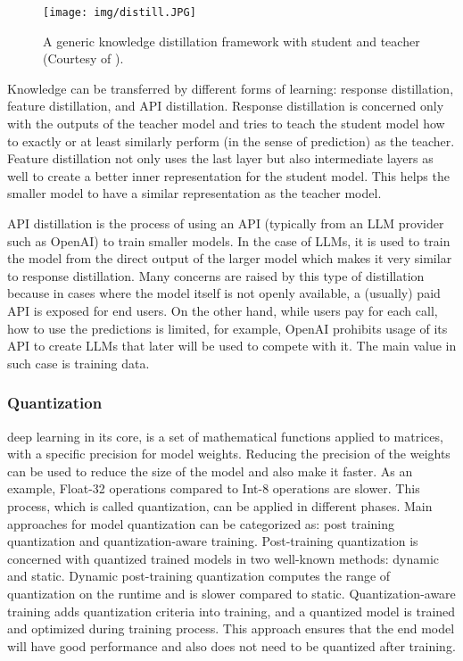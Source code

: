 \documentclass[conference]{IEEEtran}
\begin{document}
\begin{figure}[h]
    \centering
    \texttt{[image: img/distill.JPG]}
    \caption{A generic knowledge distillation framework with student and teacher (Courtesy of \cite{gou2021knowledge}).}
    \label{fig:distill}
\end{figure}

Knowledge can be transferred by different forms of learning: response distillation, feature distillation, and API distillation. Response distillation is concerned only with the outputs of the teacher model and tries to teach the student model how to exactly or at least similarly perform (in the sense of prediction) as the teacher. Feature distillation not only uses the last layer but also intermediate layers as well to create a better inner representation for the student model. This helps the smaller model to have a similar representation as the teacher model.

API distillation is the process of using an API (typically from an LLM provider such as OpenAI) to train smaller models. In the case of LLMs, it is used to train the model from the direct output of the larger model which makes it very similar to response distillation. Many concerns are raised by this type of distillation because in cases where the model itself is not openly available, a (usually) paid API is exposed for end users. On the other hand, while users pay for each call, how to use the predictions is limited, for example, OpenAI prohibits usage of its API to create LLMs that later will be used to compete with it. The main value in such case is training data. 


\subsubsection{\textbf{Quantization}}
deep learning in its core, is a set of mathematical functions applied to matrices, with a specific precision for model weights. Reducing the precision of the weights can be used to reduce the size of the model and also make it faster. As an example, Float-32 operations compared to Int-8 operations are slower. This process, which is called quantization, can be applied in different phases.
Main approaches for model quantization can be categorized as: post training quantization and quantization-aware training.  Post-training quantization is concerned with quantized trained models in two well-known methods: dynamic and static. Dynamic post-training quantization computes the range of quantization on the runtime and is slower compared to static. Quantization-aware training adds quantization criteria into training, and a quantized model is trained and optimized during training process. This approach ensures that the end model will have good performance and also does not need to be quantized after training.
\end{document}
